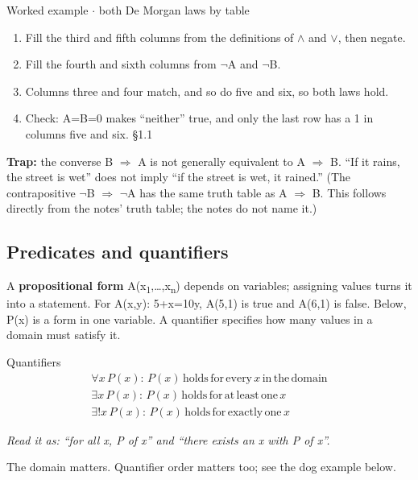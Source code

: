 \documentclass[11pt]{article}
\begin{document}
\begin{keepsection}
\begin{keepsection}
\begin{workedbox}{Worked example \ensuremath{\cdot} both De Morgan laws by table}
\begin{enumerate}
\item Fill the third and fifth columns from the definitions of \ensuremath{\land} and \ensuremath{\lor}, then negate.
\item Fill the fourth and sixth columns from \ensuremath{\neg}A and \ensuremath{\neg}B.
\item Columns three and four match, and so do five and six, so both laws hold.
\item Check: A=B=0 makes “neither” true, and only the last row has a 1 in columns five and six. \hfill{\small\color{FAUblue}§1.1}
\end{enumerate}
\end{workedbox}

\begin{notebox}\textbf{Trap:} the converse B \ensuremath{\Rightarrow} A is not generally equivalent to A \ensuremath{\Rightarrow} B. “If it rains, the street is wet” does not imply “if the street is wet, it rained.” (The contrapositive \ensuremath{\neg}B \ensuremath{\Rightarrow} \ensuremath{\neg}A has the same truth table as A \ensuremath{\Rightarrow} B. This follows directly from the notes’ truth table; the notes do not name it.)\end{notebox}
\end{keepsection}

\begin{keepsection}
\subsection{Predicates and quantifiers}

A \textbf{propositional form} A(x\textsubscript{1},…,x\textsubscript{n}) depends on variables; assigning values turns it into a statement. For A(x,y): 5+x=10y, A(5,1) is true and A(6,1) is false. Below, P(x) is a form in one variable. A quantifier specifies how many values in a domain must satisfy it.

\begin{equationcard}{Quantifiers}
\[ \begin{gathered} \forall {x}\, {P}({x}):\, {P}({x})\, \text{holds}\, \text{for}\, \text{every}\, {x}\, \text{in}\, \text{the}\, \text{domain} \\ \exists {x}\, {P}({x}):\, {P}({x})\, \text{holds}\, \text{for}\, \text{at}\, \text{least}\, \text{one}\, {x} \\ \exists !{x}\, {P}({x}):\, {P}({x})\, \text{holds}\, \text{for}\, \text{exactly}\, \text{one}\, {x} \end{gathered} \]
{\small \emph{Read it as: “for all x, P of x” and “there exists an x with P of x”.}\par The domain matters. Quantifier order matters too; see the dog example below.}
\end{equationcard}


\end{keepsection}
\end{keepsection}
\end{document}
